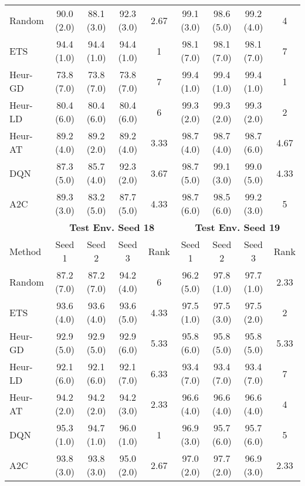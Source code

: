 \begin{table}[t]
{\begin{tabular}{lcccccccc}
Random     & 90.0 (2.0) & 88.1 (3.0) & 92.3 (3.0) & 2.67 & 99.1 (3.0) & 98.6 (5.0) & 99.2 (4.0) & 4    \\
ETS        & 94.4 (1.0) & 94.4 (1.0) & 94.4 (1.0) & 1    & 98.1 (7.0) & 98.1 (7.0) & 98.1 (7.0) & 7    \\
Heur-GD & 73.8 (7.0) & 73.8 (7.0) & 73.8 (7.0) & 7    & 99.4 (1.0) & 99.4 (1.0) & 99.4 (1.0) & 1    \\
Heur-LD & 80.4 (6.0) & 80.4 (6.0) & 80.4 (6.0) & 6    & 99.3 (2.0) & 99.3 (2.0) & 99.3 (2.0) & 2    \\
Heur-AT & 89.2 (4.0) & 89.2 (2.0) & 89.2 (4.0) & 3.33 & 98.7 (4.0) & 98.7 (4.0) & 98.7 (6.0) & 4.67 \\
DQN        & 87.3 (5.0) & 85.7 (4.0) & 92.3 (2.0) & 3.67 & 98.7 (5.0) & 99.1 (3.0) & 99.0 (5.0) & 4.33 \\
A2C        & 89.3 (3.0) & 83.2 (5.0) & 87.7 (5.0) & 4.33 & 98.7 (6.0) & 98.5 (6.0) & 99.2 (3.0) & 5    \\ \midrule
\textbf{}  & \multicolumn{4}{c}{\textbf{Test Env. Seed 18}}    & \multicolumn{4}{c}{\textbf{Test Env. Seed 19}}    \\
    \cmidrule(lr){2-5} \cmidrule(lr){6-9} 
Method     & Seed 1     & Seed 2     & Seed 3     & Rank & Seed 1     & Seed 2     & Seed 3     & Rank \\ \midrule
Random     & 87.2 (7.0) & 87.2 (7.0) & 94.2 (4.0) & 6    & 96.2 (5.0) & 97.8 (1.0) & 97.7 (1.0) & 2.33 \\
ETS        & 93.6 (4.0) & 93.6 (4.0) & 93.6 (5.0) & 4.33 & 97.5 (1.0) & 97.5 (3.0) & 97.5 (2.0) & 2    \\
Heur-GD & 92.9 (5.0) & 92.9 (5.0) & 92.9 (6.0) & 5.33 & 95.8 (6.0) & 95.8 (5.0) & 95.8 (5.0) & 5.33 \\
Heur-LD & 92.1 (6.0) & 92.1 (6.0) & 92.1 (7.0) & 6.33 & 93.4 (7.0) & 93.4 (7.0) & 93.4 (7.0) & 7    \\
Heur-AT & 94.2 (2.0) & 94.2 (2.0) & 94.2 (3.0) & 2.33 & 96.6 (4.0) & 96.6 (4.0) & 96.6 (4.0) & 4    \\
DQN        & 95.3 (1.0) & 94.7 (1.0) & 96.0 (1.0) & 1    & 96.9 (3.0) & 95.7 (6.0) & 95.7 (6.0) & 5    \\
A2C        & 93.8 (3.0) & 93.8 (3.0) & 95.0 (2.0) & 2.67 & 97.0 (2.0) & 97.7 (2.0) & 96.9 (3.0) & 2.33 \\
\bottomrule
\end{tabular}
}
\end{table}